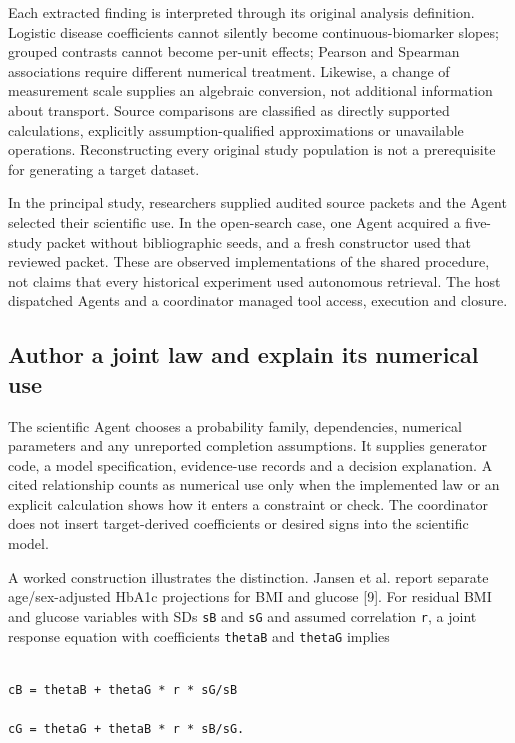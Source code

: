 \documentclass[10pt,twocolumn]{article}
\begin{document}
Each extracted finding is interpreted through its original analysis definition. Logistic disease coefficients cannot silently become continuous-biomarker slopes; grouped contrasts cannot become per-unit effects; Pearson and Spearman associations require different numerical treatment. Likewise, a change of measurement scale supplies an algebraic conversion, not additional information about transport. Source comparisons are classified as directly supported calculations, explicitly assumption-qualified approximations or unavailable operations. Reconstructing every original study population is not a prerequisite for generating a target dataset.


In the principal study, researchers supplied audited source packets and the Agent selected their scientific use. In the open-search case, one Agent acquired a five-study packet without bibliographic seeds, and a fresh constructor used that reviewed packet. These are observed implementations of the shared procedure, not claims that every historical experiment used autonomous retrieval. The host dispatched Agents and a coordinator managed tool access, execution and closure.


\subsection{Author a joint law and explain its numerical use}

The scientific Agent chooses a probability family, dependencies, numerical parameters and any unreported completion assumptions. It supplies generator code, a model specification, evidence-use records and a decision explanation. A cited relationship counts as numerical use only when the implemented law or an explicit calculation shows how it enters a constraint or check. The coordinator does not insert target-derived coefficients or desired signs into the scientific model.


A worked construction illustrates the distinction. Jansen et al. report separate age/sex-adjusted HbA1c projections for BMI and glucose [9]. For residual BMI and glucose variables with SDs \texttt{sB} and \texttt{sG} and assumed correlation \texttt{r}, a joint response equation with coefficients \texttt{thetaB} and \texttt{thetaG} implies


\begin{lstlisting}

cB = thetaB + thetaG * r * sG/sB

cG = thetaG + thetaB * r * sB/sG.

\end{lstlisting}
\end{document}
